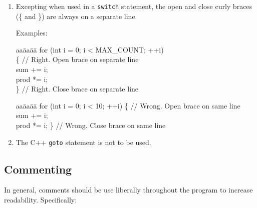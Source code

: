 \documentclass[11pt]{article}
\begin{document}
\begin{enumerate}
\item Excepting when used in a {\tt switch} statement, the open
and close curly braces (\{ and \}) are always on a separate line.

Examples:
\begin{tt}
\begin{tabbing}
aa\=aa\=aa\= \kill
for (int i = 0; i < MAX\_COUNT; ++i) \\
\>\{             // Right.  Open brace on separate line \\
\>\>sum += i;                                           \\
\>\>prod *= i;                                          \\
\>\}             // Right.  Close brace on separate line
\end{tabbing}
\end{tt}

\begin{tt}
\begin{tabbing}
aa\=aa\=aa\= \kill
for (int i = 0; i < 10; ++i) \{ // Wrong.  Open brace on same line\\
\>sum += i;                                                       \\
\>prod *= i; \}                 // Wrong.  Close brace on same line
\end{tabbing}
\end{tt}

\item The C++ {\tt goto} statement is not to be used.
\end{enumerate}
\subsection{Commenting}
In general, comments should be use liberally throughout the program to
increase readability.  Specifically:
\end{document}
